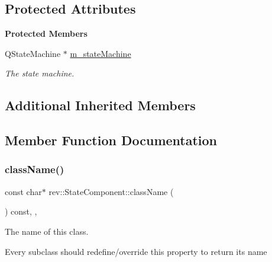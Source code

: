 \subsection*{Protected Attributes}
\begin{Indent}\textbf{ Protected Members}\par
\begin{DoxyCompactItemize}
\item 
\mbox{\label{classrev_1_1_state_component_a1dbb72daca679226b2a55e40f4c171e4}} 
Q\+State\+Machine $\ast$ \mbox{\hyperlink{classrev_1_1_state_component_a1dbb72daca679226b2a55e40f4c171e4}{m\+\_\+state\+Machine}}
\begin{DoxyCompactList}\small\item\em The state machine. \end{DoxyCompactList}\end{DoxyCompactItemize}
\end{Indent}
\subsection*{Additional Inherited Members}


\subsection{Member Function Documentation}
\mbox{\label{classrev_1_1_state_component_a1f24f3bb3f13a85784d866fb9caaeabc}} 
\subsubsection{\texorpdfstring{className()}{className()}}
{\footnotesize\ttfamily const char$\ast$ rev\+::\+State\+Component\+::class\+Name (\begin{DoxyParamCaption}{ }\end{DoxyParamCaption}) const\hspace{0.3cm}{\ttfamily [inline]}, {\ttfamily [override]}, {\ttfamily [virtual]}}



The name of this class. 

Every subclass should redefine/override this property to return its name 

